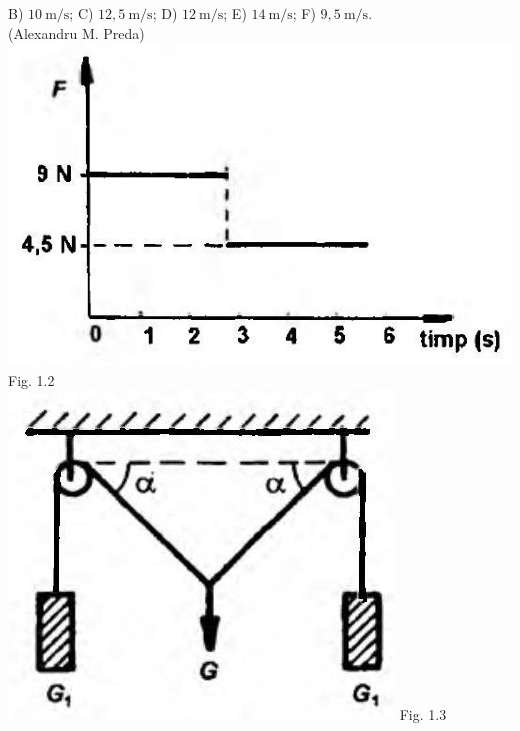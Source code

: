 \documentclass[10pt]{article}
\begin{document}
B) $10 \mathrm{~m} / \mathrm{s}$; C) $12,5 \mathrm{~m} / \mathrm{s}$; D) $12 \mathrm{~m} / \mathrm{s}$; E) $14 \mathrm{~m} / \mathrm{s}$; F) $9,5 \mathrm{~m} / \mathrm{s}$.\\ (Alexandru M. Preda)\\ \includegraphics[max width=\textwidth, center]{2025_07_01_5b3ff9fa0d508c8e9f17g-010(1)} Fig. 1.2\\ \includegraphics[max width=\textwidth, center]{2025_07_01_5b3ff9fa0d508c8e9f17g-010} Fig. 1.3\\
\end{document}
